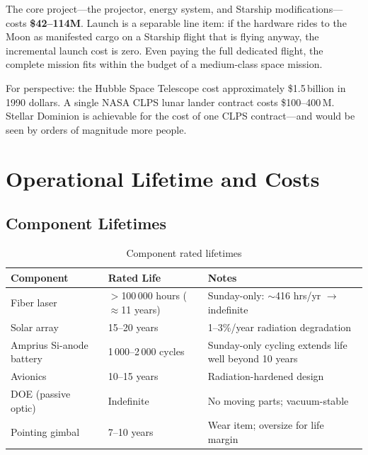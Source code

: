 \documentclass[10pt,letterpaper]{article}
\begin{document}
\noindent The core project---the projector, energy system, and Starship
modifications---costs \textbf{\$42--114M}. Launch is a separable line item:
if the hardware rides to the Moon as manifested cargo on a Starship flight
that is flying anyway, the incremental launch cost is zero. Even paying the
full dedicated flight, the complete mission fits within the budget of a
medium-class space mission.

\medskip
\noindent For perspective: the Hubble Space Telescope cost approximately
\$1.5\,billion in 1990 dollars. A single NASA CLPS lunar lander contract
costs \$100--400\,M. Stellar Dominion is achievable for the cost of one CLPS
contract---and would be seen by orders of magnitude more people.

\section{Operational Lifetime and Costs}

\subsection{Component Lifetimes}

\begin{table}[!ht]
\centering\small
\caption{Component rated lifetimes}
\label{tab:lifetimes}
\begin{tabularx}{\linewidth}{llX}
\toprule
\textbf{Component} & \textbf{Rated Life} & \textbf{Notes} \\
\midrule
Fiber laser & $>$100\,000 hours ($\approx$11 years) & Sunday-only: $\sim$416 hrs/yr $\to$ indefinite \\
Solar array & 15--20 years & 1--3\%/year radiation degradation \\
Amprius Si-anode battery & 1\,000--2\,000 cycles & Sunday-only cycling extends life well beyond 10 years \\
Avionics & 10--15 years & Radiation-hardened design \\
DOE (passive optic) & Indefinite & No moving parts; vacuum-stable \\
Pointing gimbal & 7--10 years & Wear item; oversize for life margin \\
\bottomrule
\end{tabularx}
\end{table}
\end{document}
